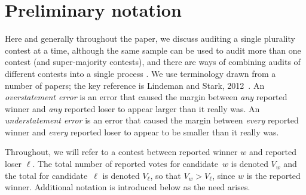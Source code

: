 \documentclass[runningheads]{llncs}
\begin{document}
%
%

\section{Preliminary notation}
Here and generally throughout the paper, we 
discuss auditing a single plurality contest at a time, although the same sample can be used to audit
more than one contest (and super-majority contests), and there are ways of combining audits of different contests into
a single process \cite{stark09c,stark10d}.
We use terminology drawn from a number of papers; the key reference is Lindeman and Stark, 2012~\cite{lindemanStark12}.
An \emph{overstatement error} is an error that caused the margin between \emph{any} reported
winner and \emph{any} reported loser to appear larger than it really was.
An \emph{understatement error} is an error that caused the margin between \emph{every} reported
winner and \emph{every} reported loser to appear to be smaller than it really was.

Throughout, we will refer to a contest between reported winner $w$ and reported loser $\ell$.
The total number of reported votes for candidate~$w$ is denoted $V_w$ 
and the total for candidate~$\ell$ is denoted $V_\ell$, so that $V_w > V_\ell$, since 
$w$ is the reported winner.
Additional notation is introduced below as the need arises.
\end{document}
